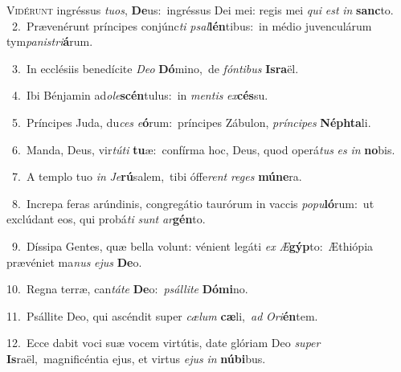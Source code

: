 \lettrine{\initial\textcolor{\initialcolor}{V}}{idérunt} ingréssus \textit{tu}\-\textit{os}, \textbf{De}\-us:~\star ingréssus Dei mei: regis mei \textit{qui} \textit{est} \textit{in} \textbf{sanc}\-to.\\
{\numbfont\textcolor{\numbcolor}{~2.}}~Prævenérunt príncipes conjúnc\textit{ti} \textit{psal}\-\textbf{lén}tibus:~\star in médio juvenculárum tym\-\textit{pa}\-\textit{nis}\textit{tri}\textbf{á}rum.\par
{\numbfont\textcolor{\numbcolor}{~3.}}~In ecclésiis benedícite \textit{De}\-\textit{o} \textbf{Dó}\-mino,~\star de \textit{fón}\-\textit{ti}\textit{bus} \textbf{Is}\-\textbf{ra}ël.\par
{\numbfont\textcolor{\numbcolor}{~4.}}~Ibi Bénjamin ad\-\textit{o}\-\textit{le}\textbf{scén}tulus:~\star in \textit{men}\-\textit{tis} \textit{ex}\-\textbf{cés}su.\par
{\numbfont\textcolor{\numbcolor}{~5.}}~Príncipes Juda, du\textit{ces} \textit{e}\-\textbf{ó}rum:~\star príncipes Zábulon, \textit{prín}\-\textit{ci}\textit{pes} \textbf{Néph}\-\textbf{ta}li.\par
{\numbfont\textcolor{\numbcolor}{~6.}}~Manda, Deus, vir\-\textit{tú}\-\textit{ti} \textbf{tu}\-æ:~\star confírma hoc, Deus, quod operá\textit{tus} \textit{es} \textit{in} \textbf{no}\-bis.\par
{\numbfont\textcolor{\numbcolor}{~7.}}~A templo tuo \textit{in} \textit{Je}\-\textbf{rú}salem,~\star tibi óffe\textit{rent} \textit{re}\-\textit{ges} \textbf{mú}\-\textbf{ne}ra.\par
{\numbfont\textcolor{\numbcolor}{~8.}}~Increpa feras arúndinis, congregátio taurórum in vaccis \textit{po}\-\textit{pu}\textbf{ló}rum:~\star ut exclúdant eos, qui probá\textit{ti} \textit{sunt} \textit{ar}\-\textbf{gén}to.\par
{\numbfont\textcolor{\numbcolor}{~9.}}~Díssipa Gentes, quæ bella volunt: vénient legáti \textit{ex} \textit{Æ}\-\textbf{gýp}to:~\star Æthiópia prævéniet ma\textit{nus} \textit{e}\-\textit{jus} \textbf{De}\-o.\par
{\numbfont\textcolor{\numbcolor}{10.}}~Regna terræ, can\-\textit{tá}\-\textit{te} \textbf{De}\-o:~\star \textit{psál}\-\textit{li}\textit{te} \textbf{Dó}\-\textbf{mi}no.\par
{\numbfont\textcolor{\numbcolor}{11.}}~Psállite Deo, qui ascéndit super \textit{cæ}\-\textit{lum} \textbf{cæ}\-li,~\star \textit{ad} \textit{O}\-\textit{ri}\textbf{én}tem.\par
{\numbfont\textcolor{\numbcolor}{12.}}~Ecce dabit voci suæ vocem virtútis, date glóriam Deo \textit{su}\-\textit{per} \textbf{Is}\-raël,~\star magnificéntia ejus, et virtus \textit{e}\-\textit{jus} \textit{in} \textbf{nú}\-\textbf{bi}bus.\par
